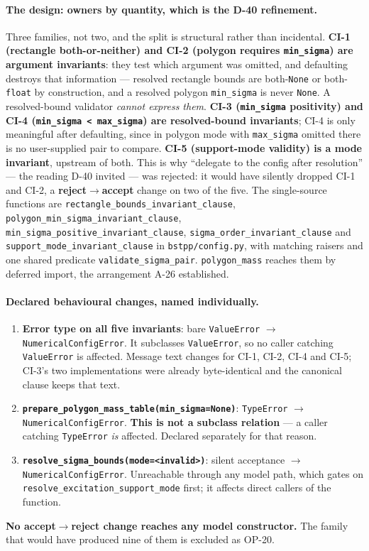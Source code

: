 \documentclass[
  10pt,
]{article}
\providecommand{\tightlist}{%
  \setlength{\itemsep}{0pt}\setlength{\parskip}{0pt}}
\begin{document}
\paragraph{The design: owners by quantity, which is the D-40 refinement.}
Three families, not two, and the split is structural rather than incidental. \textbf{CI-1 (rectangle both-or-neither) and CI-2 (polygon requires \texttt{min\_sigma}) are argument invariants}: they test which argument was omitted, and defaulting destroys that information --- resolved rectangle bounds are both-\texttt{None} or both-\texttt{float} by construction, and a resolved polygon \texttt{min\_sigma} is never \texttt{None}. A resolved-bound validator \emph{cannot express them}. \textbf{CI-3 (\texttt{min\_sigma} positivity) and CI-4 (\texttt{min\_sigma < max\_sigma}) are resolved-bound invariants}; CI-4 is only meaningful after defaulting, since in polygon mode with \texttt{max\_sigma} omitted there is no user-supplied pair to compare. \textbf{CI-5 (support-mode validity) is a mode invariant}, upstream of both. This is why ``delegate to the config after resolution'' --- the reading D-40 invited --- was rejected: it would have silently dropped CI-1 and CI-2, a \textbf{reject$\rightarrow$accept} change on two of the five. The single-source functions are \texttt{rectangle\_bounds\_invariant\_clause}, \texttt{polygon\_min\_sigma\_invariant\_clause}, \texttt{min\_sigma\_positive\_invariant\_clause}, \texttt{sigma\_order\_invariant\_clause} and \texttt{support\_mode\_invariant\_clause} in \texttt{bstpp/config.py}, with matching raisers and one shared predicate \texttt{validate\_sigma\_pair}. \texttt{polygon\_mass} reaches them by deferred import, the arrangement A-26 established.

\paragraph{Declared behavioural changes, named individually.}
\begin{enumerate}
\tightlist
\item \textbf{Error type on all five invariants}: bare \texttt{ValueError} $\rightarrow$ \texttt{NumericalConfigError}. It subclasses \texttt{ValueError}, so no caller catching \texttt{ValueError} is affected. Message text changes for CI-1, CI-2, CI-4 and CI-5; CI-3's two implementations were already byte-identical and the canonical clause keeps that text.
\item \textbf{\texttt{prepare\_polygon\_mass\_table(min\_sigma=None)}}: \texttt{TypeError} $\rightarrow$ \texttt{NumericalConfigError}. \textbf{This is not a subclass relation} --- a caller catching \texttt{TypeError} \emph{is} affected. Declared separately for that reason.
\item \textbf{\texttt{resolve\_sigma\_bounds(mode=<invalid>)}}: silent acceptance $\rightarrow$ \texttt{NumericalConfigError}. Unreachable through any model path, which gates on \texttt{resolve\_excitation\_support\_mode} first; it affects direct callers of the function.
\end{enumerate}
\textbf{No accept$\rightarrow$reject change reaches any model constructor.} The family that would have produced nine of them is excluded as OP-20.
\end{document}
